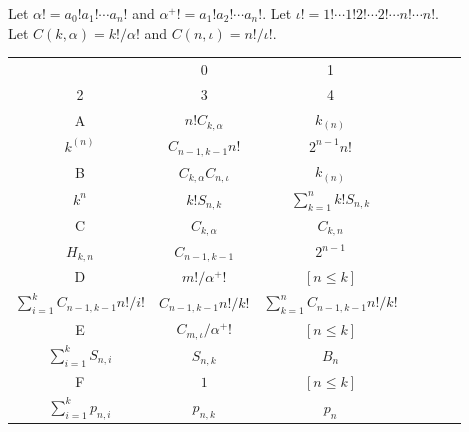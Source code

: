 Let $\alpha! = a_0! a_1! \cdots a_n!$ and $\alpha^+! = a_1! a_2! \cdots a_n!$. Let $\iota! = 1! \cdots 1! 2! \cdots 2! \cdots n! \cdots n!$. \\
Let $C(k, \alpha) = k! / \alpha!$ and $C(n, \iota) = n! / \iota!$. \\ 
\begin{center} \begin{tabular}{|c|c|c|c|c|c|c|} \hline
  & 0                            & 1           \\ 2                                   & 3                    & 4                                   \\ \hline
A & $n! C_{k, \alpha}$           & $k_{(n)}$   \\ $k^{(n)}$                           & $C_{n-1, k-1} n!$    & $2^{n-1} n!$                        \\ \hline
B & $C_{k, \alpha} C_{n, \iota}$ & $k_{(n)}$   \\ $k^n$                               & $k! S_{n, k}$        & $\sum_{k=1}^{n} k! S_{n, k}$        \\ \hline
C & $C_{k, \alpha}$              & $C_{k, n}$  \\ $H_{k, n}$                          & $C_{n-1, k-1}$       & $2^{n-1}$                           \\ \hline
D & $m! / \alpha^+!$             & $[n \le k]$ \\ $\sum_{i=1}^{k} C_{n-1, k-1} n!/i!$ & $C_{n-1, k-1} n!/k!$ & $\sum_{k=1}^{n} C_{n-1, k-1} n!/k!$ \\ \hline
E & $C_{m, \iota} / \alpha^+!$   & $[n \le k]$ \\ $\sum_{i=1}^{k} S_{n, i}$           & $S_{n, k}$           & $B_n$                               \\ \hline
F & $1$                          & $[n \le k]$ \\ $\sum_{i=1}^{k} p_{n, i}$           & $p_{n, k}$           & $p_n$                               \\ \hline
\end{tabular} \end{center}